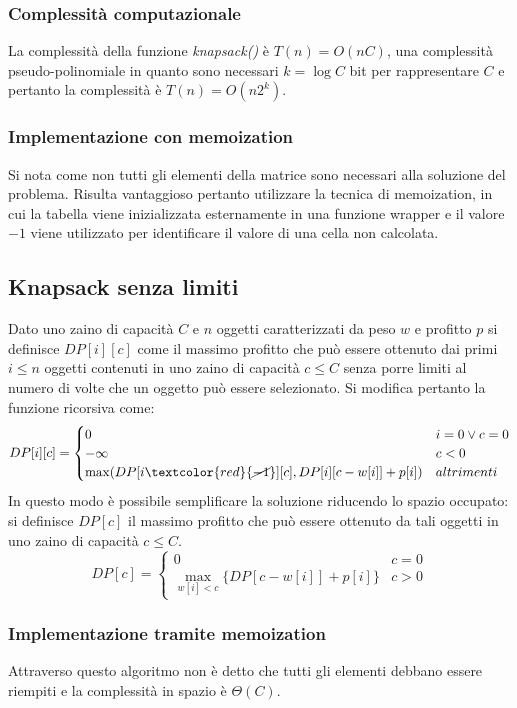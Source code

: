 		\subsubsection{Complessit\`a computazionale}
			La complessit\`a della funzione \emph{knapsack()} \`e $T(n) = O(nC)$, una complessit\`a pseudo-polinomiale in quanto sono necessari $k = \log C$ bit per 
			rappresentare $C$ e pertanto la complessit\`a \`e $T(n) = O(n2^k)$.
		\subsubsection{Implementazione con memoization}
			Si nota come non tutti gli elementi della matrice sono necessari alla soluzione del problema. Risulta vantaggioso pertanto utilizzare la tecnica di 
			memoization, in cui la tabella viene inizializzata esternamente in una funzione wrapper e il valore $-1$ viene utilizzato per identificare il valore di
			una cella non calcolata. \\
			
	
	\subsection{Knapsack senza limiti}
		Dato uno zaino di capacit\`a $C$ e $n$ oggetti caratterizzati da peso $w$ e profitto $p$ si definisce $DP[i][c]$ come il massimo profitto che pu\`o essere
		ottenuto dai primi $i\le n$ oggetti contenuti in uno zaino di capacit\`a $c\le C$ senza porre limiti al numero di volte che un oggetto pu\`o essere 
		selezionato. Si modifica pertanto la funzione ricorsiva come:
		$$
		DP[i][c] =
		\begin{cases}
		0\quad & i = 0 \lor c = 0\\
		-\infty & c<0\\
		\max(DP[i \textcolor{red}{ \cancel{-1} } ][c], DP[i][c-w[i]]+p[i]) & altrimenti
		\end{cases}
		$$
		In questo modo \`e possibile semplificare la soluzione riducendo lo spazio occupato: si definisce $DP[c]$ il massimo profitto che pu\`o essere ottenuto
		da tali oggetti in uno zaino di capacit\`a $c\le C$. 
		$$
		DP[c] =
		\begin{cases}
		0\quad & c = 0\\
		\max\limits_{w[i]<c}\{DP[c-w[i]]+p[i]\} &  c > 0
		\end{cases}
		$$
		\subsubsection{Implementazione tramite memoization}
			
			Attraverso questo algoritmo non \`e detto che tutti gli elementi debbano essere riempiti e la complessit\`a in spazio \`e $\Theta(C)$.
